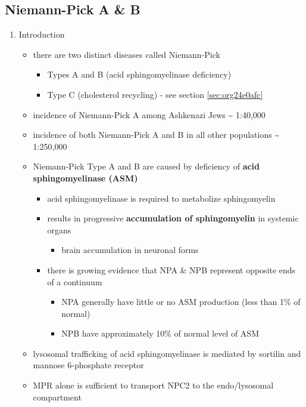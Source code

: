 \documentclass{scrartcl}
\begin{document}
\subsection{Niemann-Pick  A \& B}
\label{sec:org4ec2a7b}
\begin{enumerate}
\item Introduction
\label{sec:org7b53336}
\begin{itemize}
\item there are two distinct diseases called Niemann-Pick
\begin{itemize}
\item Types A and B (acid sphingomyelinase deficiency)
\item Type C (cholesterol recycling) - see section \ref{sec:org24e0afc}
\end{itemize}

\item incidence of Niemann-Pick A among Ashkenazi Jews \textasciitilde{} 1:40,000
\item incidence of both Niemann-Pick A and B in all other populations \textasciitilde{} 1:250,000
\item Niemann-Pick Type A and B are caused by deficiency of \textbf{acid sphingomyelinase (ASM)}
\begin{itemize}
\item acid sphingomyelinase is required to metabolize sphingomyelin
\item results in progressive \textbf{accumulation of sphingomyelin} in systemic organs
\begin{itemize}
\item brain accumulation in neuronal forms
\end{itemize}
\item there is growing evidence that NPA \& NPB represent opposite ends of a continuum
\begin{itemize}
\item NPA generally have little or no ASM production (less than 1\% of normal)
\item NPB have approximately 10\% of normal level of ASM
\end{itemize}
\end{itemize}
\item lysosomal trafficking of acid sphingomyelinase is mediated by sortilin and mannose 6-phosphate receptor
\item MPR alone is sufficient to transport NPC2 to the endo/lysosomal compartment
\end{itemize}



\end{enumerate}
\end{document}
